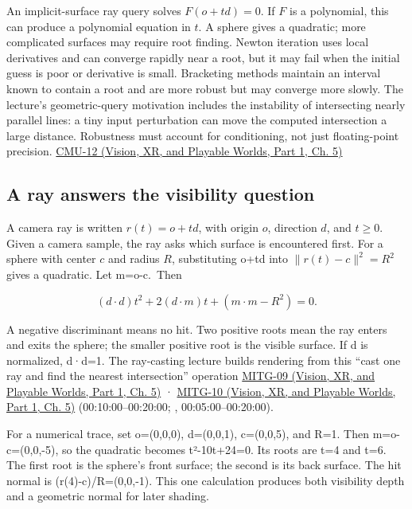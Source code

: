 An implicit-surface ray query solves \(F(o+td)=0\). If \(F\) is a polynomial, this can produce a polynomial equation in \(t\). A sphere gives a quadratic; more complicated surfaces may require root finding. Newton iteration uses local derivatives and can converge rapidly near a root, but it may fail when the initial guess is poor or derivative is small. Bracketing methods maintain an interval known to contain a root and are more robust but may converge more slowly. The lecture's geometric-query motivation includes the instability of intersecting nearly parallel lines: a tiny input perturbation can move the computed intersection a large distance. Robustness must account for conditioning, not just floating-point precision. \href{../07-Vision-XR-and-Playable-Worlds-P01/main.pdf\#nameddest=04-visual-computing-ii-ch036-cmu-12---geometric-queries}{CMU-12 (Vision, XR, and Playable Worlds, Part 1, Ch. 5)}

\subsection{A ray answers the visibility question}\label{04-visual-computing-ii-ch028-a-ray-answers-the-visibility-question}

\hypertarget{04-visual-computing-ii-ch028-a-ray-answers-the-visibility-question}{}

A camera ray is written \(r(t)=o+td\), with origin \(o\), direction \(d\), and \(t\ge0\). Given a camera sample, the ray asks which surface is encountered first. For a sphere with center \(c\) and radius \(R\), substituting o+td into \(\|r(t)-c\|^2=R^2\) gives a quadratic. Let m=o-c.~Then

\[
(d\cdot d)t^2+2(d\cdot m)t+(m\cdot m-R^2)=0.
\]

A negative discriminant means no hit. Two positive roots mean the ray enters and exits the sphere; the smaller positive root is the visible surface. If d is normalized, d·d=1. The ray-casting lecture builds rendering from this ``cast one ray and find the nearest intersection'' operation \href{../07-Vision-XR-and-Playable-Worlds-P01/main.pdf\#nameddest=04-visual-computing-ii-ch036-mitg-09---ray-casting}{MITG-09 (Vision, XR, and Playable Worlds, Part 1, Ch. 5)} · \href{../07-Vision-XR-and-Playable-Worlds-P01/main.pdf\#nameddest=04-visual-computing-ii-ch036-mitg-10---ray-casting-ii}{MITG-10 (Vision, XR, and Playable Worlds, Part 1, Ch. 5)} (00:10:00--00:20:00; , 00:05:00--00:20:00).

For a numerical trace, set o=(0,0,0), d=(0,0,1), c=(0,0,5), and R=1. Then m=o-c=(0,0,-5), so the quadratic becomes t²-10t+24=0. Its roots are t=4 and t=6. The first root is the sphere's front surface; the second is its back surface. The hit normal is (r(4)-c)/R=(0,0,-1). This one calculation produces both visibility depth and a geometric normal for later shading.

